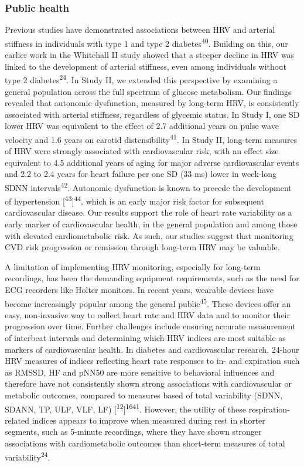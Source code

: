 \documentclass[
  a4paper,
  headsepline=true,
  open=any]{scrbook}
\begin{document}
\hypertarget{public-health}{%
\subsubsection{Public health}\label{public-health}}

Previous studies have demonstrated associations between HRV and arterial
stiffness in individuals with type 1 and type 2
diabetes\textsuperscript{40}. Building on this, our earlier work in the
Whitehall II study showed that a steeper decline in HRV was linked to
the development of arterial stiffness, even among individuals without
type 2 diabetes\textsuperscript{24}. In Study II, we extended this
perspective by examining a general population across the full spectrum
of glucose metabolism. Our findings revealed that autonomic dysfunction,
measured by long-term HRV, is consistently associated with arterial
stiffness, regardless of glycemic status. In Study I, one SD lower HRV
was equivalent to the effect of 2.7 additional years on pulse wave
velocity and 1.6 years on carotid distensibility\textsuperscript{41}. In
Study II, long-term measures of HRV were strongly associated with
cardiovascular risk, with an effect size equivalent to 4.5 additional
years of aging for major adverse cardiovascular events and 2.2 to 2.4
years for heart failure per one SD (33 ms) lower in week-long SDNN
intervals\textsuperscript{42}. Autonomic dysfunction is known to precede
the development of hypertension
{[}\textsuperscript{43}{]}\textsuperscript{44}, which is an early major
risk factor for subsequent cardiovascular disease. Our results support
the role of heart rate variability as a early marker of cardiovascular
health, in the general population and among those with elevated
cardiometabolic risk. As such, our studies suggest that monitoring CVD
risk progression or remission through long-term HRV may be valuable.

A limitation of implementing HRV monitoring, especially for long-term
recordings, has been the demanding equipment requirements, such as the
need for ECG recorders like Holter monitors. In recent years, wearable
devices have become increasingly popular among the general
public\textsuperscript{45}. These devices offer an easy, non-invasive
way to collect heart rate and HRV data and to monitor their progression
over time. Further challenges include ensuring accurate measurement of
interbeat intervals and determining which HRV indices are most suitable
as markers of cardiovascular health. In diabetes and cardiovascular
research, 24-hour HRV measures of indices reflecting heart rate
responses to in- and expiration such as RMSSD, HF and pNN50 are more
sensitive to behavioral influences and therefore have not consistently
shown strong associations with cardiovascular or metabolic outcomes,
compared to measures based of total variability (SDNN, SDANN, TP, ULF,
VLF, LF)
{[}\textsuperscript{12}{]}\textsuperscript{16}\textsuperscript{41}.
However, the utility of these respiration-related indices appears to
improve when measured during rest in shorter segments, such as 5-minute
recordings, where they have shown stronger associations with
cardiometabolic outcomes than short-term measures of total
variability\textsuperscript{24}.
\end{document}
